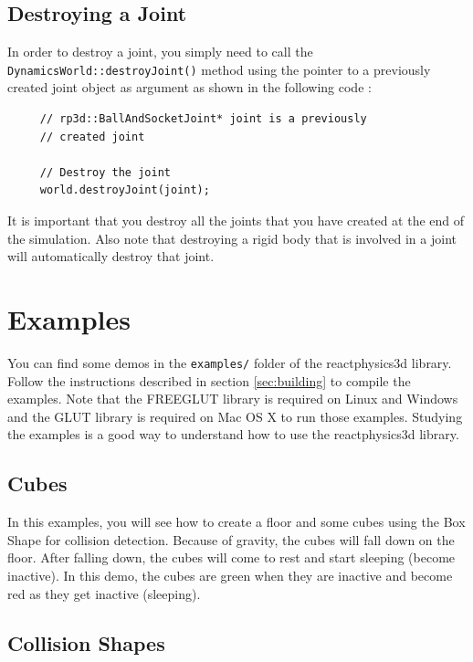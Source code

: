 \documentclass[a4paper,12pt]{article}
\begin{document}
    \subsection{Destroying a Joint}

    In order to destroy a joint, you simply need to call the \texttt{DynamicsWorld::destroyJoint()} method using the pointer to
    a previously created joint object as argument as shown in the following code : \\

    \begin{lstlisting}
     // rp3d::BallAndSocketJoint* joint is a previously
     // created joint

     // Destroy the joint
     world.destroyJoint(joint);
  \end{lstlisting}

    \vspace{0.6cm}

    It is important that you destroy all the joints that you have created at the end of the simulation. Also note that destroying a
    rigid body that is involved in a joint will automatically destroy that joint.

    \section{Examples}

    You can find some demos in the \texttt{examples/} folder of
    the reactphysics3d library. Follow the instructions described in section \ref{sec:building} to
    compile the examples. Note that the FREEGLUT library is required on Linux and Windows
    and the GLUT library is required on Mac OS X to run those examples. Studying the examples is a
    good way to understand how to use the reactphysics3d library.

    \subsection{Cubes}

    In this examples, you will see how to create a floor and some cubes using the Box Shape for collision detection. Because of gravity,
    the cubes will fall down on the floor. After falling down, the cubes will come to rest and start sleeping (become inactive). In this demo,
    the cubes are green when they are inactive and become red as they get inactive (sleeping).

    \subsection{Collision Shapes}
\end{document}
